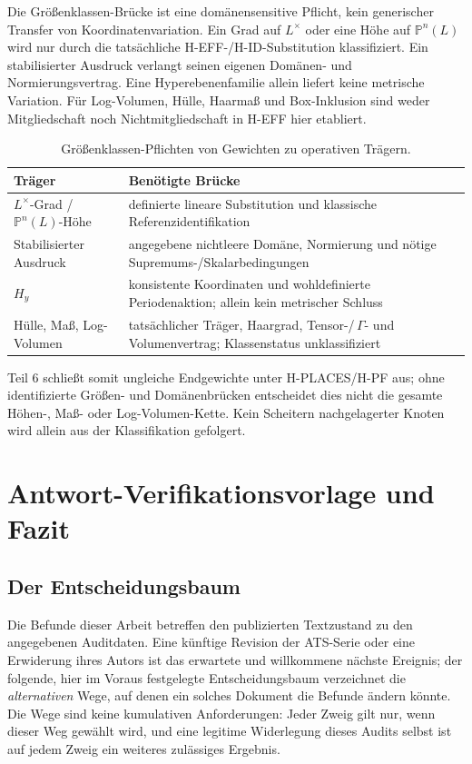 \documentclass[11pt,a4paper]{article}
\theoremstyle{definition}
\theoremstyle{remark}
\begin{document}
Die Größenklassen-Brücke ist eine domänensensitive Pflicht, kein
generischer Transfer von Koordinatenvariation. Ein Grad auf $L^\times$
oder eine Höhe auf $\mathbb P^n(L)$ wird nur durch die tatsächliche
H-EFF-/H-ID-Substitution klassifiziert. Ein stabilisierter Ausdruck
verlangt seinen eigenen Domänen- und Normierungsvertrag. Eine
Hyperebenenfamilie allein liefert keine metrische Variation. Für
Log-Volumen, Hülle, Haarmaß und Box-Inklusion sind weder Mitgliedschaft
noch Nichtmitgliedschaft in H-EFF hier etabliert.
\begin{table}[htbp]\centering\small
\caption{Größenklassen-Pflichten von Gewichten zu operativen Trägern.}
\label{tab:quantity-class-bridge}
\begin{tabularx}{\textwidth}{@{}>{\raggedright\arraybackslash}p{} >{\raggedright\arraybackslash}X@{}}
\toprule Träger & Benötigte Brücke \\\midrule
$L^\times$-Grad / $\mathbb P^n(L)$-Höhe & definierte lineare Substitution und klassische Referenzidentifikation \\
Stabilisierter Ausdruck & angegebene nichtleere Domäne, Normierung und nötige Supremums-/Skalarbedingungen \\
$H_y$ & konsistente Koordinaten und wohldefinierte Periodenaktion; allein kein metrischer Schluss \\
Hülle, Maß, Log-Volumen & tatsächlicher Träger, Haargrad, Tensor-/\,$\Gamma$- und Volumenvertrag; Klassenstatus unklassifiziert \\
\bottomrule\end{tabularx}\end{table}
Teil 6 schließt somit ungleiche Endgewichte unter H-PLACES/H-PF aus;
ohne identifizierte Größen- und Domänenbrücken entscheidet dies nicht die
gesamte Höhen-, Maß- oder Log-Volumen-Kette. Kein Scheitern nachgelagerter
Knoten wird allein aus der Klassifikation gefolgert.

\section{Antwort-Verifikationsvorlage und Fazit}\label{sec:template}

\subsection{Der Entscheidungsbaum}

Die Befunde dieser Arbeit betreffen den publizierten Textzustand zu den
angegebenen Auditdaten. Eine künftige Revision der ATS-Serie oder eine
Erwiderung ihres Autors ist das erwartete und willkommene nächste Ereignis;
der folgende, hier im Voraus festgelegte Entscheidungsbaum verzeichnet die
\emph{alternativen} Wege, auf denen ein solches Dokument die Befunde ändern
könnte. Die Wege sind keine kumulativen Anforderungen: Jeder Zweig gilt nur,
wenn dieser Weg gewählt wird, und eine legitime Widerlegung dieses Audits
selbst ist auf jedem Zweig ein weiteres zulässiges Ergebnis.
\end{document}
